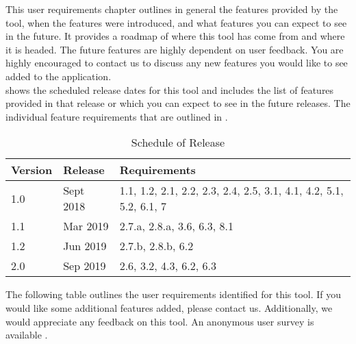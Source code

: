 This user requirements chapter outlines in general the features provided by the tool, when the features 
were introduced, and what features you can expect to see in the future. It provides a roadmap of 
where this tool has come from and where it is headed. The future features are highly dependent on 
user feedback. You are highly encouraged to contact us to discuss any new features you would like to see 
added to the application. \\

 shows the scheduled release dates for this tool and includes the list of features 
provided in that release or which you can expect to see in the future releases. The individual feature 
requirements that are outlined in .

\begin{table}[hbt!]                    
  \centering
\begin{adjustbox}{max width=\textwidth}            
  \begin{tabular}{lll}                    
    \toprule          
      Version & 	Release	 & Requirements \\  \hline
      1.0	& Sept 2018 &	1.1, 1.2, 2.1, 2.2, 2.3, 2.4, 2.5, 3.1, 4.1, 4.2, 5.1, 5.2, 6.1, 7\\  \hline
      1.1	 & Mar 2019 &	2.7.a, 2.8.a, 3.6, 6.3, 8.1\\  \hline
      1.2	 & Jun 2019 &	2.7.b, 2.8.b, 6.2 \\  \hline
      2.0	 & Sep 2019 &	2.6, 3.2, 4.3, 6.2, 6.3\\  \hline
  \end{tabular}
\end{adjustbox}
  \caption{Schedule of Release}             
  \label{tab:schedule}                 
\end{table}

The following table outlines the user requirements identified for this
tool. If you would like some additional features added, please contact us.
Additionally, we would appreciate any feedback on this tool. An anonymous
user survey is available .


